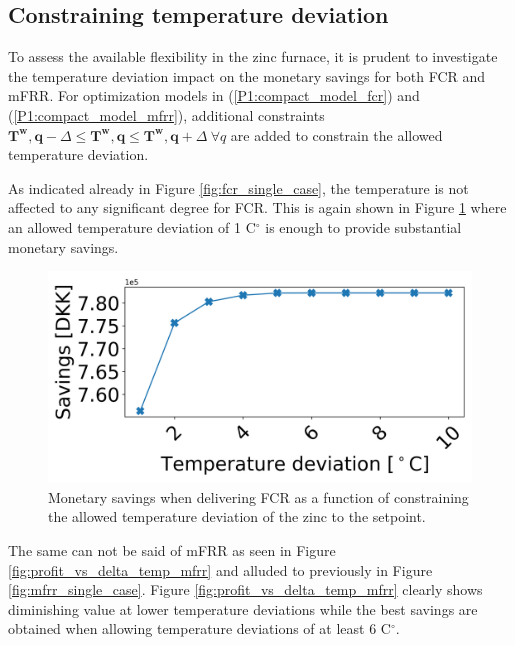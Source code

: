 \documentclass[lettersize,journal]{IEEEtran}
\begin{document}
\subsection{Constraining temperature deviation}

To assess the available flexibility in the zinc furnace, it is prudent to investigate the temperature deviation impact on the monetary savings for both FCR and mFRR. For optimization models in (\ref{P1:compact_model_fcr}) and (\ref{P1:compact_model_mfrr}), additional constraints $\bm{T^{w},q} - \Delta \leq \bm{T^{w},q} \leq \bm{T^{w},q} + \Delta \ \forall{q}$ are added to constrain the allowed temperature deviation.

As indicated already in Figure \ref{fig:fcr_single_case}, the temperature is not affected to any significant degree for FCR. This is again shown in Figure \ref{fig:profit_vs_delta_temp_fcr} where an allowed temperature deviation of 1 C$^{\circ}$ is enough to provide substantial monetary savings.

\begin{figure}[t]
    \centering
    \includegraphics[width=\columnwidth]{figures/profit_vs_delta_temp_fcr.png}
    \caption{Monetary savings when delivering FCR as a function of constraining the allowed temperature deviation of the zinc to the setpoint.}
    \label{fig:profit_vs_delta_temp_fcr}
\end{figure}

The same can not be said of mFRR as seen in Figure \ref{fig:profit_vs_delta_temp_mfrr} and alluded to previously in Figure \ref{fig:mfrr_single_case}. Figure \ref{fig:profit_vs_delta_temp_mfrr} clearly shows diminishing value at lower temperature deviations while the best savings are obtained when allowing temperature deviations of at least 6 C$^{\circ}$.
\end{document}
